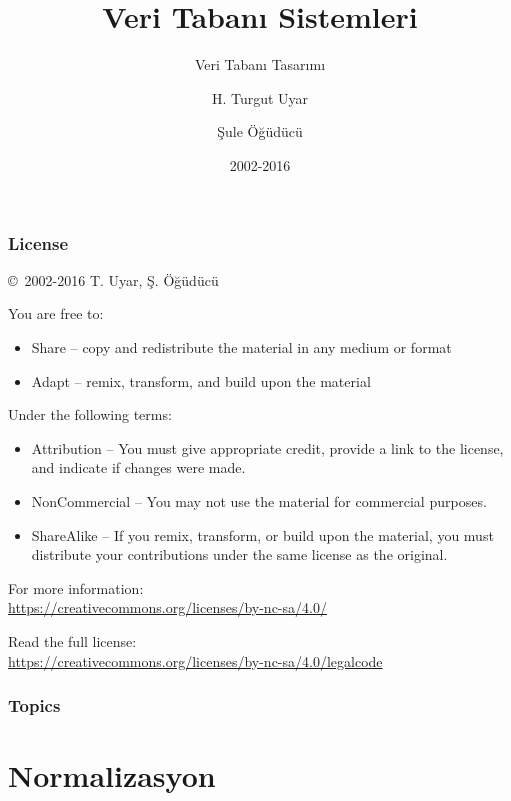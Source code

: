 \documentclass[dvipsnames]{beamer}
\title{Veri Tabanı Sistemleri}
\subtitle{Veri Tabanı Tasarımı}
\author{H. Turgut Uyar \and Şule Öğüdücü}
\date{2002-2016}
\theoremstyle{theorem}
\begin{document}
\begin{frame}
  \titlepage
\end{frame}

\begin{frame}
  \frametitle{License}

  \hfill
  \copyright~2002-2016 T. Uyar, Ş. Öğüdücü

  \vfill
  \begin{footnotesize}
    You are free to:
    \begin{itemize}
      \itemsep0em
      \item Share -- copy and redistribute the material in any medium or format
      \item Adapt -- remix, transform, and build upon the material
    \end{itemize}

    Under the following terms:
    \begin{itemize}
      \itemsep0em
      \item Attribution -- You must give appropriate credit, provide a link to
        the license, and indicate if changes were made.

      \item NonCommercial -- You may not use the material for commercial
        purposes.

      \item ShareAlike -- If you remix, transform, or build upon the material,
        you must distribute your contributions under the same license as the
        original.
    \end{itemize}
  \end{footnotesize}

  \begin{small}
    For more information:\\
    \url{https://creativecommons.org/licenses/by-nc-sa/4.0/}

    \smallskip
    Read the full license:\\
    \url{https://creativecommons.org/licenses/by-nc-sa/4.0/legalcode}
  \end{small}
\end{frame}

\begin{frame}
  \frametitle{Topics}
  \tableofcontents
\end{frame}

\section{Normalizasyon}
\end{document}
